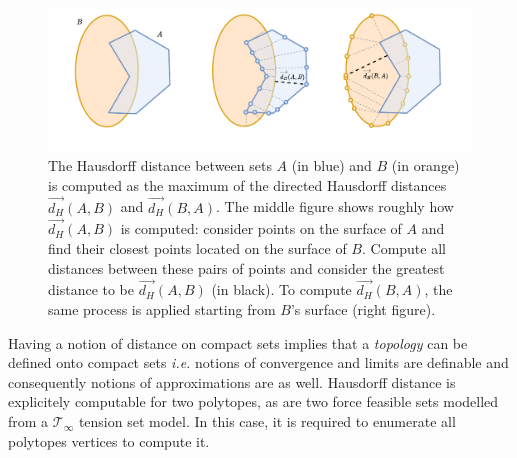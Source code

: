 \begin{figure}[!htb]
    \captionsetup{justification=centering}
        \centering
        \includegraphics[trim={30 30 30 5},clip,width=0.9\linewidth]{img/chapter_4/hausdorff_distance_explained.pdf}
    \caption{The Hausdorff distance between sets $A$ (in blue) and $B$ (in orange) is computed as the maximum of the directed Hausdorff distances $\overrightarrow{d_H}(A,B)$ and $\overrightarrow{d_H}(B, A)$. The middle figure shows roughly how $\overrightarrow{d_H}(A,B)$ is computed: consider points on the surface of $A$ and find their closest points located on the surface of $B$. Compute all distances between these pairs of points and consider the greatest distance to be $\overrightarrow{d_H}(A,B)$ (in black). To compute $\overrightarrow{d_H}(B,A)$, the same process is applied starting from $B$'s surface (right figure).}
    \label{fig:hausdorff_distance_explained}
\end{figure}

Having a notion of distance on compact sets implies that a \emph{topology} can be defined onto compact sets \emph{i.e.} notions of convergence and limits are definable and consequently notions of approximations are as well. Hausdorff distance is explicitely computable for two polytopes, as are two force feasible sets modelled from a $\mathcal{T}_{\infty}$ tension set model. In this case, it is required to enumerate all polytopes vertices to compute it.

